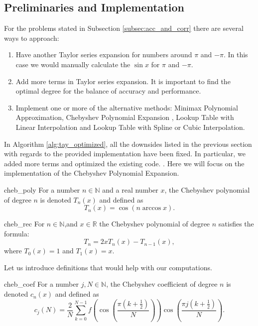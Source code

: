 \documentclass[12pt]{article}
\begin{document}
\subsection{Preliminaries and Implementation}
For the problems stated in Subsection \ref{subsec:acc_and_corr} there are several ways to approach:
\begin{enumerate}
    \item Have another Taylor series expansion for numbers around $\pi$ and $-\pi$. In this case we would manually calculate the $\sin x$ for $\pi$ and $-\pi$.
    \item  Add more terms in Taylor series expansion. It is important to find the optimal degree for the balance of accuracy and performance.
    \item Implement one or more of the alternative methods: Minimax Polynomial Approximation, Chebyshev Polynomial Expansion \cite{press2007numerical}, Lookup Table with Linear Interpolation and Lookup Table with Spline or Cubic Interpolation.
\end{enumerate}
In Algorithm \ref{alg:tay_optimized}, all the downsides listed in the previous section with regards to the provided implementation have been fixed.
In particular, we added more terms and optimized the existing code.
.
Here we will focus on the implementation of the Chebyshev Polynomial Expansion.

\begin{DefinitionColor}{\cite[p~.233]{press2007numerical}}{cheb_poly}
    For a number $n\in \mathbb{N}$ and a real number $x$, the Chebyshev polynomial of degree $n$ is denoted $T_n(x)$ and defined as
    \begin{equation*}
        T_n(x) = \cos(n \arccos x).
    \end{equation*}
\end{DefinitionColor}

\begin{TheoremColor}{}{cheb_rec}
    For $n \in \mathbb{N}$,and $x \in \mathbb{R}$ the Chebyshev polynomial of degree $n$ satisfies the formula:
    \begin{equation*}
        T_n=2xT_n(x) - T_{n-1}(x),
    \end{equation*}
    where $T_0(x) =1$ and $T_1(x) = x$.
\end{TheoremColor}
Let us introduce definitions that would help with our computations.

\begin{DefinitionColor}{\cite[p~.234]{press2007numerical}}{cheb_coef}
    For a number $j, N\in \mathbb{N}$, the Chebyshev coefficient of degree $n$ is denoted $c_n(x)$ and defined as
    \begin{equation*}
        c_j(N) = \frac{2}{N} \sum_{k=0}^{N-1} f\left( \cos\left(  \frac{\pi(k+\frac{1}{2})}{N}\right)  \right) \cos \left(\frac{\pi j(k+\frac{1}{2})}{N}\right).
    \end{equation*}
\end{DefinitionColor}
\end{document}
